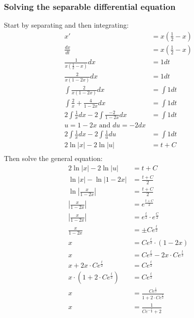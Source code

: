 \documentclass{article}
\begin{document}
\subsubsection*{Solving the separable differential equation}
Start by separating and then integrating:
\begin{equation}
    \begin{split}
        x' &= x(\frac{1}{2} - x) \\
        \frac{dx}{dt} &= x(\frac{1}{2} - x) \\
        \frac{1}{x(\frac{1}{2} - x)} dx &= 1 dt \\
        \frac{2}{x(1 - 2x)} dx &= 1 dt \\
        \int \frac{2}{x(1 - 2x)} dx &= \int 1 dt \\ %
        \int \frac{2}{x} + \frac{4}{1-2x} dx &= \int 1 dt \\
        2 \int \frac{1}{x} dx - 2 \int \frac{-2}{1-2x} dx &= \int 1 dt \\
        \text{$u = 1 - 2x$ and $du = -2 dx$} \\
        2 \int \frac{1}{x} dx - 2 \int \frac{1}{u} du &= \int 1 dt \\
        2 \ln|x| - 2 \ln|u| &= t + C \\
    \end{split}
\end{equation}
Then solve the general equation:
\begin{equation}
    \begin{split}
        2 \ln|x| - 2 \ln|u| &= t + C \\
        \ln|x| - \ln|1-2x| &= \frac{t + C}{2} \\
        \ln|\frac{x}{1-2x}| &= \frac{t + C}{2} \\
        |\frac{x}{1-2x}| &= e^{\frac{t + C}{2}}  \\
        |\frac{x}{1-2x}| &= e^{\frac{t}{2}} \cdot e^{\frac{C}{2}}  \\
        \frac{x}{1-2x} &= \pm Ce^{\frac{t}{2}}  \\
        x &= Ce^{\frac{t}{2}} \cdot (1 - 2x) \\
        x &=  Ce^{\frac{t}{2}} - 2x \cdot Ce^{\frac{t}{2}} \\
        x + 2x \cdot Ce^{\frac{t}{2}} &=  Ce^{\frac{t}{2}} \\
        x \cdot (1 + 2 \cdot Ce^{\frac{t}{2}}) &=  Ce^{\frac{t}{2}} \\
        x &= \frac{Ce^{\frac{t}{2}}}{1 + 2 \cdot Ce^{\frac{t}{2}}} \\
        x &= \frac{1}{Ce^{-\frac{t}{2}} + 2} \\
    \end{split}
\end{equation}
\end{document}
